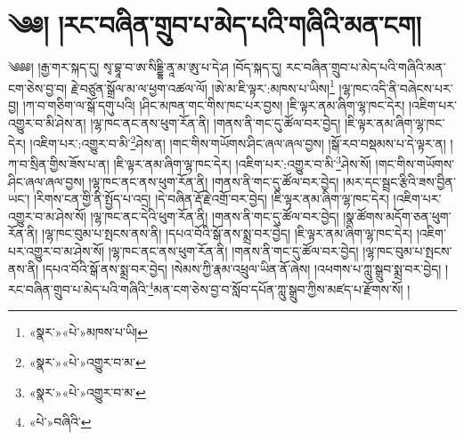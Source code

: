 \chapter{༄༅། །རང་བཞིན་གྲུབ་པ་མེད་པའི་གཞིའི་མན་ངག།}༄༅༅། །རྒྱ་གར་སྐད་དུ། སྭ་བྷཱ་བ་ཨ་སིདྡྷི་ནཱ་མ་ཨུ་པ་དེ་ཤ །བོད་སྐད་དུ། རང་བཞིན་གྲུབ་པ་མེད་པའི་གཞིའི་མན་ངག་ཅེས་བྱ་བ། རྗེ་བཙུན་སྒྲོལ་མ་ལ་ཕྱག་འཚལ་ལོ། །ཨེ་མ་ཇི་ལྟར་:མཁས་པ་ཡིས།\footnote{«སྣར་»«པེ་»མཁས་པ་ཡི།} །ལྷ་ཁང་འདི་ནི་བཞེངས་པར་བྱ། །ཀ་བ་གཅིག་ལ་སྒོ་དགུ་པའི། །ཤིང་མཁན་གང་གིས་ཁང་པར་བྱས། །ཇི་ལྟར་ནམ་ཞིག་ལྷ་ཁང་དེར། །འཇིག་པར་འགྱུར་བ་མི་ཤེས་ན། །ལྷ་ཁང་ནང་ནས་ཕུག་རོན་ནི། །གནས་ནི་གང་དུ་ཚོལ་བར་བྱེད། །ཇི་ལྟར་ནམ་ཞིག་ལྷ་ཁང་དེར། །འཇིག་པར་:འགྱུར་བ་མི་\footnote{«སྣར་»«པེ་»འགྱུར་བ་མ་}ཤེས་ན། །གང་གིས་གཡོགས་ཤིང་ཞལ་ཞལ་བྱས། །སྒོ་རབ་བསྡམས་པ་དེ་ལྟར་ན། །ཀ་བ་སྲིན་གྱིས་ཟོས་པ་ན། །ཇི་ལྟར་ནམ་ཞིག་ལྷ་ཁང་དེར། །འཇིག་པར་:འགྱུར་བ་མི་\footnote{«སྣར་»«པེ་»འགྱུར་བ་མ་}ཤེས་སོ། །གང་གིས་གཡོགས་ཤིང་ཞལ་ཞལ་བྱས། །ལྷ་ཁང་ནང་ནས་ཕུག་རོན་ནི། །གནས་ནི་གང་དུ་ཚོལ་བར་བྱེད། །མར་དང་སྦྲང་རྩིའི་ཟས་བྱིན་ཡང་། །རིགས་ངན་གྱི་ནི་སྤྱོད་པ་འདྲ། །དེ་བཞིན་རྡོ་རྗེ་འགྲོ་བར་བྱེད། །ཇི་ལྟར་ནམ་ཞིག་ལྷ་ཁང་དེར། །འཇིག་པར་འགྱུར་བ་མ་ཤེས་སོ། །ལྷ་ཁང་ནང་དེའི་ཕུག་རོན་ནི། །གནས་ནི་གང་དུ་ཚོལ་བར་བྱེད། །སྣ་ཚོགས་མདོག་ཅན་ཕུག་རོན་ནི། །ལྷ་ཁང་བུམ་པ་སྤངས་ནས་ནི། །དཔའ་བོའི་སྒོ་ནས་སྨྲ་བར་བྱེད། །ཇི་ལྟར་ནམ་ཞིག་ལྷ་ཁང་དེར། །འཇིག་པར་འགྱུར་བ་མ་ཤེས་སོ། །ལྷ་ཁང་ནང་ནས་ཕུག་རོན་ནི། །གནས་ནི་གང་དུ་ཚོལ་བར་བྱེད། །ལྷ་ཁང་བུམ་པ་སྤངས་ནས་ནི། །དཔའ་བོའི་སྒོ་ནས་སྨྲ་བར་བྱེད། །སེམས་ཀྱི་རྣམ་འཕྲུལ་ཡིན་ནོ་ཞེས། །འཕགས་པ་ཀླུ་སྒྲུབ་སྨྲ་བར་བྱེད། །རང་བཞིན་གྲུབ་པ་མེད་པའི་གཞིའི་\footnote{«པེ་»བཞིའི་}མན་ངག་ཅེས་བྱ་བ་སློབ་དཔོན་ཀླུ་སྒྲུབ་ཀྱིས་མཛད་པ་རྫོགས་སོ། ། 